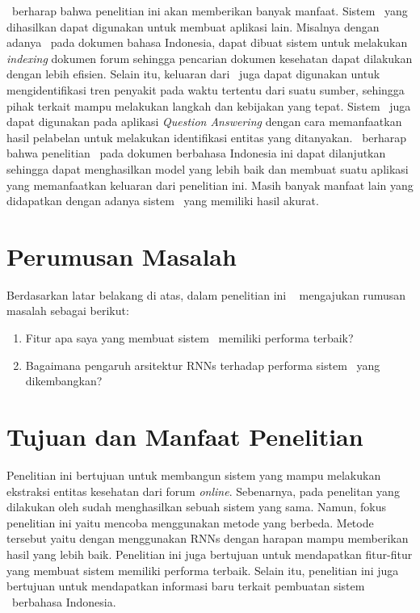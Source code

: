 	\Saya~berharap bahwa penelitian ini akan memberikan banyak manfaat. Sistem \mer~yang dihasilkan dapat digunakan untuk membuat aplikasi lain. Misalnya dengan adanya \mer~pada dokumen bahasa Indonesia, dapat dibuat sistem untuk melakukan \textit{indexing} dokumen forum sehingga pencarian dokumen kesehatan dapat dilakukan dengan lebih efisien. Selain itu, keluaran dari \mer~juga dapat digunakan untuk mengidentifikasi tren penyakit pada waktu tertentu dari suatu sumber, sehingga pihak terkait mampu melakukan langkah dan kebijakan yang tepat. Sistem \mer~juga dapat digunakan pada aplikasi \textit{Question Answering} \citep{abacha2011medical} dengan cara memanfaatkan hasil pelabelan untuk melakukan identifikasi entitas yang ditanyakan.  \Saya~berharap bahwa penelitian \mer~pada dokumen berbahasa Indonesia ini dapat dilanjutkan sehingga dapat menghasilkan model yang lebih baik dan membuat suatu aplikasi yang memanfaatkan keluaran dari penelitian ini. Masih banyak manfaat lain yang didapatkan dengan adanya sistem \mer~yang memiliki hasil akurat. 

\section{Perumusan Masalah}
Berdasarkan latar belakang di atas, dalam penelitian ini \saya~ mengajukan rumusan masalah sebagai berikut:
\begin{enumerate}
	\item Fitur apa saya yang membuat sistem \mer~memiliki performa terbaik?
	\item Bagaimana pengaruh arsitektur RNNs terhadap performa sistem \mer~yang dikembangkan?
\end{enumerate}

\section{Tujuan dan Manfaat Penelitian}
Penelitian ini bertujuan untuk membangun sistem yang mampu melakukan ekstraksi entitas kesehatan dari forum \textit{online}. Sebenarnya, pada penelitan yang dilakukan oleh \cite{skripsiKakRadit} sudah menghasilkan sebuah sistem yang sama. Namun, fokus penelitian ini yaitu mencoba menggunakan metode yang berbeda. Metode tersebut yaitu dengan menggunakan RNNs dengan harapan mampu memberikan hasil yang lebih baik. Penelitian ini juga bertujuan untuk mendapatkan fitur-fitur yang membuat sistem memiliki performa terbaik. Selain itu, penelitian ini juga bertujuan untuk mendapatkan informasi baru terkait pembuatan sistem \mer~berbahasa Indonesia.

